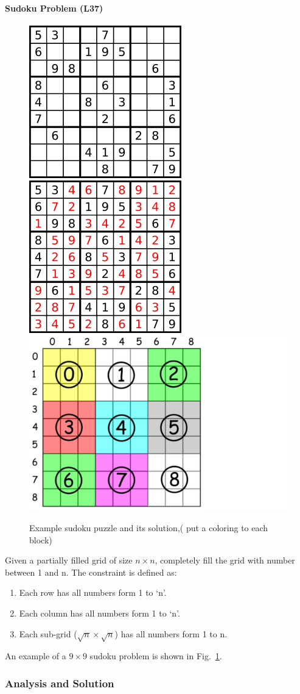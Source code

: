 \documentclass[../main.tex]{subfiles}
\begin{document}
\paragraph{Sudoku Problem (L37)}
\begin{figure}[!ht]
    \centering
    \includegraphics[width= 0.35\columnwidth]{fig/250px-Sudoku-by-L2G-20050714.png}
    \includegraphics[width= 0.35\columnwidth]{fig/250px-Sudoku-by-L2G-20050714_solution.png}
    \includegraphics[width= 0.25\columnwidth]{fig/sudoku_grid.png}
    \caption{Example sudoku puzzle and its solution,( put a coloring to each block)}
    \label{fig:backtrack_puzzle}
\end{figure}
Given a  partially filled grid of size $n\times n$, completely fill the grid with number between 1 and n.  The constraint is defined as:
\begin{enumerate}
    \item Each row has all numbers form 1 to ‘n’.
    \item Each column has all numbers form 1 to ‘n’.
    \item Each sub-grid ($\sqrt{n}\times\sqrt{n}$) has all numbers form 1 to n.
\end{enumerate}
An example of a $9\times9$ sudoku problem is shown in Fig.~\ref{fig:backtrack_puzzle}.

\subsubsection{Analysis and Solution} 
\end{document}
